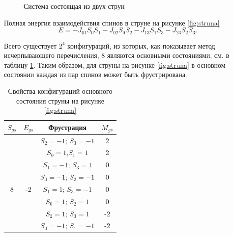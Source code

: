 \documentclass[utf8, babel, sor, jor, amsmath, amssymb, reprint]{elsarticle} %
\begin{document}
\begin{figure}[h]
\begin{minipage}{0.3\textwidth}
		\centering
		\caption{Система состоящая из двух струн}
		\label{fig: 3x2}
	\end{minipage}
\end{figure}


Полная энергия взаимодействия спинов в струне на рисунке \ref{fig:struna}
\begin{equation}
	E = -J_{01} S_0 S_1-J_{02} S_0 S_2-J_{13} S_1 S_3-J_{23} S_2 S_3.
	\label{eq:ising_energy_2x2}
\end{equation}

Всего существует $2^4$ конфигураций, из которых, как показывает метод исчерпывающего перечисления, 8 являются основными состояниями, см. в таблицу \ref{tab:Strunags}. Таким образом, для струны на рисунке \ref{fig:struna} в основном состоянии каждая из пар спинов может быть фрустрирована.

\begin{table}[h]
		\centering
	\begin{tabular}{|c|c|c|c|}
	
		\hline
	 $S_{gs}$	& $E_{gs}$    & Фрустрация  &   $M_{gs}$   \\
	\hline
	    & & 	$S_2=-1$; $S_3=-1$ & 2   \\ 	\cline{3-4}
	   	& & $S_0=1$,$S_1=1$        & 2\\ 	\cline{3-4}
		& &  $S_1=-1$; $S_3=1$     & 0    \\ \cline{3-4} 
        &  & $S_0=-1$; $S_2=-1$ &	0  \\ 
		\cline{3-4} 
		8	\multirow{3}{*}{} & -2 \multirow{3}{*}{} & $S_1=1$;  $S_3=-1$     &  0\\ \cline{3-4}	
		& & $S_0=1$;  $S_2=1$      &  0\\ \cline{3-4}
		& &	$S_2=1$;  $S_3=1$      &  -2\\ \cline{3-4}
		& &	$S_0=-1$; $S_1=-1$     & -2\\ \hline
	
	\end{tabular}
	\caption{Свойства конфигураций основного состояния струны на рисунке \ref{fig:struna}}
	\label{tab:Strunags}
\end{table}
\end{document}
